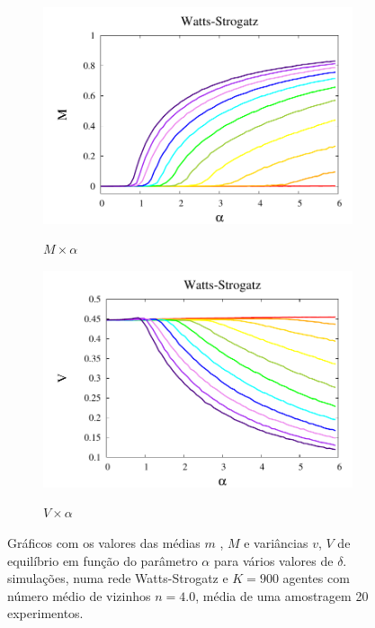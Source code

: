 \begin{figure}
\begin{subfigure}[]{0.45\textwidth}
        \includegraphics[width = \textwidth]{Figures/DeltaXBeta_MMag}
        \label{fig:fM}
        \caption{$M\times\alpha$}
    \end{subfigure}
    \begin{subfigure}[]{0.45\textwidth}
        \includegraphics[width = \textwidth]{Figures/DeltaXBeta_VVar}
        \label{fig:fV}
        \caption{$V\times\alpha$}
    \end{subfigure}
    \newline
    \caption{ 
        Gráficos com os valores das médias $m$ , $M$ e variâncias  $v$, $V$
        de equilíbrio em função do parâmetro $\alpha$ para vários valores
        de $\delta$. simulações, numa rede Watts-Strogatz e $K=900$ agentes
        com número médio de vizinhos $n=4.0$, média de uma amostragem 20
        experimentos.
    }
    \label{fig:ov}
\end{figure}

